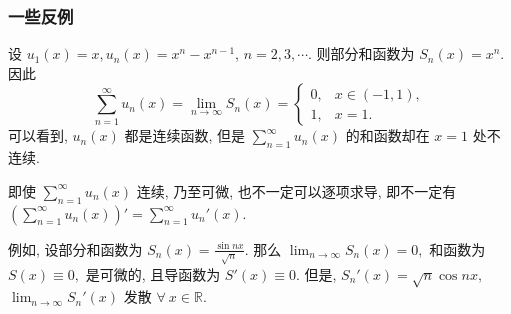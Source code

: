 
\begin{frame}
\frametitle{一些反例}

\begin{eg}[函数项级数不保持连续性]
设 $u_1(x) = x, u_n(x) = x^n - x^{n-1}$, $n = 2, 3, \cdots.$ 则部分和函数为 $S_n(x) = x^n.$ 因此
\[
\sum_{n=1}^\infty u_n(x) = \lim_{n \to \infty} S_n(x) = \begin{cases}
0, & x \in (-1, 1), \\
1, & x = 1.
\end{cases}
\]
可以看到, $u_n(x)$ 都是连续函数, 但是 $\sum_{n=1}^\infty u_n(x)$ 的和函数却在 $x = 1$ 处不连续.
\end{eg}

\pause

\begin{eg}[函数项级数不能逐项求导]
即使 $\sum_{n=1}^\infty u_n(x)$ 连续, 乃至可微, 也不一定可以逐项求导, 即不一定有 $\left(\sum_{n=1}^\infty u_n(x)\right)' = \sum_{n=1}^\infty u_n'(x).$

\pause

例如, 设部分和函数为 $S_n(x) = \frac{\sin nx}{\sqrt{n}}.$ 那么 $\lim_{n \to \infty} S_n(x) = 0,$ 和函数为 $S(x) \equiv 0,$ 是可微的, 且导函数为 $S'(x) \equiv 0.$
\pause
但是, $S_n'(x) = \sqrt{n} \cos nx,$ $\lim_{n \to \infty} S_n'(x)$ 发散 $\forall ~ x \in \mathbb{R}.$
\end{eg}

\end{frame}


